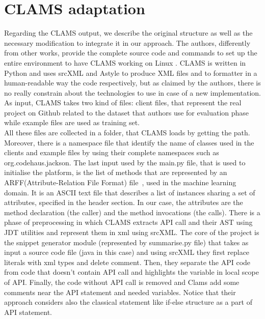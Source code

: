 \section{CLAMS adaptation}
Regarding the CLAMS output, we describe the original structure as well as the necessary modification to integrate it in our approach. The authors, differently from other works, provide the complete source code and commands to set up the entire environment to have CLAMS working on Linux . CLAMS is written in Python and uses srcXML and Astyle to produce XML files and to formatter in a human-readable way the code respectively, but as claimed by the authors, there is no really constrain about the technologies to use in case of a new implementation. As input, CLAMS takes two kind of files: client files, that represent the real project on Github related to the dataset that authors use for evaluation phase while example files are used as training set.\\ 
All these files are collected in a folder, that CLAMS loads by getting the path. Moreover, there is a namespace file that identify the name of classes used in the clients and example files by using their complete namespaces such as org.codehaus.jackson. The last input used by the main.py file, that is used to initialise the platform, is the list of methods that are represented by an ARFF(Attribute-Relation File Format) file~\cite{https://www.cs.waikato.ac.nz_last_nodate}, used in the machine learning domain. It is an ASCII text file that describes a list of instances sharing a set of attributes, specified in the header section. In our case, the attributes are the method declaration (the caller) and the method invocations (the calls). 
\newline
There is a phase of preprocessing in which CLAMS extracts API call and their AST using JDT utilities and represent them in xml using srcXML. The core of the project is the snippet generator module (represented by summarise.py file) that takes as input a source code file (java in this case) and using srcXML they first replace literals with xml types and delete comment. Then, they separate the API code from code that doesn't contain API call and highlights the variable in local scope of API. Finally, the code without API call is removed and Clams add some comments near the API statement and needed variables. Notice that their approach considers also the classical statement like if-else structure as a part of API statement. \\
